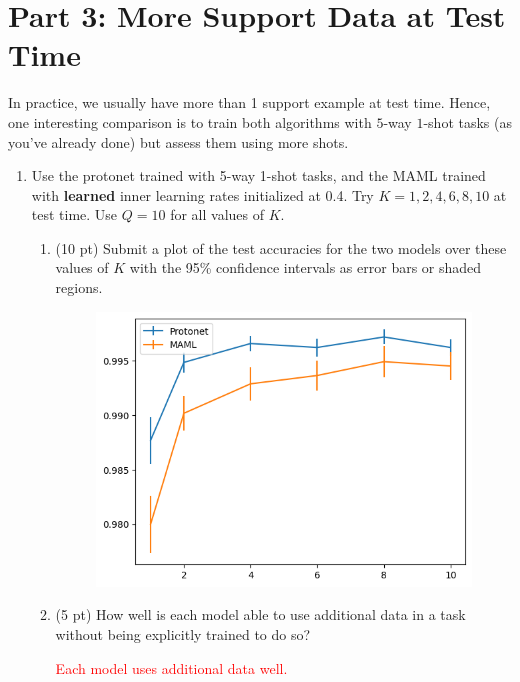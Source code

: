 \documentclass[12pt]{article}
\begin{document}
\newpage
\section*{Part 3: More Support Data at Test Time}

In practice, we usually have more than 1 support example at test time. Hence, one interesting comparison is to train both algorithms with $5$-way $1$-shot tasks (as you've already done) but assess them using more shots.

\begin{enumerate}
    \item Use the protonet trained with 5-way 1-shot tasks, and the MAML trained with \textbf{learned} inner learning rates initialized at 0.4. Try $K = 1, 2, 4, 6, 8, 10$ at test time. Use $Q = 10$ for all values of $K$. 
    \begin{enumerate}
        \item (10 pt) Submit a plot of the test accuracies for the two models over these values of $K$ with the 95\% confidence intervals as error bars or shaded regions. 

\begin{figure}[H]
\centering
\includegraphics[width=\linewidth]{figures/3.png}
\end{figure}

        
        \item (5 pt) How well is each model able to use additional data in a task without being explicitly trained to do so?

        \textcolor{red}{Each model uses additional data well.}

    \end{enumerate}
\end{enumerate}
\end{document}

